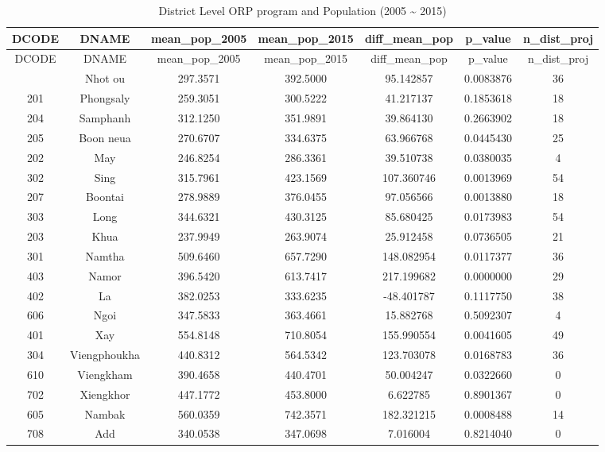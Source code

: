 \documentclass[
  letterpaper,
  DIV=11,
  numbers=noendperiod]{scrartcl}
\begin{document}
\begin{longtable}[]{@{}ccccccc@{}}
\caption{District Level ORP program and Population (2005
\textasciitilde{} 2015)}\tabularnewline
\toprule\noalign{}
DCODE & DNAME & mean\_pop\_2005 & mean\_pop\_2015 & diff\_mean\_pop &
p\_value & n\_dist\_proj \\
\midrule\noalign{}
\endfirsthead
\toprule\noalign{}
DCODE & DNAME & mean\_pop\_2005 & mean\_pop\_2015 & diff\_mean\_pop &
p\_value & n\_dist\_proj \\
\midrule\noalign{}
\endhead
\bottomrule\noalign{}
\endlastfoot
206 & Nhot ou & 297.3571 & 392.5000 & 95.142857 & 0.0083876 & 36 \\
201 & Phongsaly & 259.3051 & 300.5222 & 41.217137 & 0.1853618 & 18 \\
204 & Samphanh & 312.1250 & 351.9891 & 39.864130 & 0.2663902 & 18 \\
205 & Boon neua & 270.6707 & 334.6375 & 63.966768 & 0.0445430 & 25 \\
202 & May & 246.8254 & 286.3361 & 39.510738 & 0.0380035 & 4 \\
302 & Sing & 315.7961 & 423.1569 & 107.360746 & 0.0013969 & 54 \\
207 & Boontai & 278.9889 & 376.0455 & 97.056566 & 0.0013880 & 18 \\
303 & Long & 344.6321 & 430.3125 & 85.680425 & 0.0173983 & 54 \\
203 & Khua & 237.9949 & 263.9074 & 25.912458 & 0.0736505 & 21 \\
301 & Namtha & 509.6460 & 657.7290 & 148.082954 & 0.0117377 & 36 \\
403 & Namor & 396.5420 & 613.7417 & 217.199682 & 0.0000000 & 29 \\
402 & La & 382.0253 & 333.6235 & -48.401787 & 0.1117750 & 38 \\
606 & Ngoi & 347.5833 & 363.4661 & 15.882768 & 0.5092307 & 4 \\
401 & Xay & 554.8148 & 710.8054 & 155.990554 & 0.0041605 & 49 \\
304 & Viengphoukha & 440.8312 & 564.5342 & 123.703078 & 0.0168783 &
36 \\
610 & Viengkham & 390.4658 & 440.4701 & 50.004247 & 0.0322660 & 0 \\
702 & Xiengkhor & 447.1772 & 453.8000 & 6.622785 & 0.8901367 & 0 \\
605 & Nambak & 560.0359 & 742.3571 & 182.321215 & 0.0008488 & 14 \\
708 & Add & 340.0538 & 347.0698 & 7.016004 & 0.8214040 & 0 \\

\end{longtable}
\end{document}
